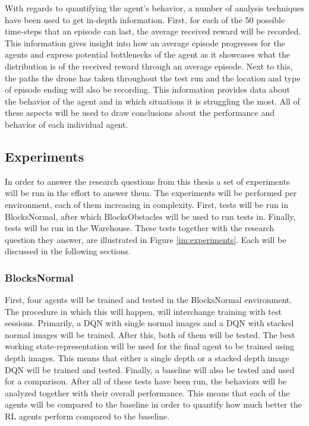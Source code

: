 With regards to quantifying the agent's behavior, a number of analysis techniques have been used 
to get in-depth information. First, for each of the 50 possible 
time-steps that an episode can last, the average received reward will be recorded. This 
information gives insight into how an average episode progresses for the agents and 
express potential bottlenecks of the agent as it showcases what the distribution is of the 
received reward through an average episode. Next to this, the paths the drone has taken 
throughout the test run and the location and type of episode ending will also be recording. 
This information provides data about the behavior of the agent and in which situations 
it is struggling the most. All of these aspects will be used to draw conclusions 
about the performance and behavior of each individual agent. 


\subsection{Experiments} \label{experiments}
In order to answer the research questions from this thesis a set of experiments will be run 
in the effort to answer them. The experiments will be performed per environment, each of them 
increasing in complexity. First, tests will be run in BlocksNormal, after which BlocksObstacles 
will be used to run tests in. Finally, tests will be run in the Warehouse. These tests together with 
the research question they answer, are illustrated 
in Figure \ref{im:experiments}. Each will be discussed in the following sections. 

\subsubsection{BlocksNormal}
First, four agents will be trained and tested in the BlocksNormal environment. The procedure 
in which this will happen, will interchange training with test sessions. Primarily, a DQN 
with single normal images and a DQN with stacked normal images will be trained. After this, 
both of them will be tested. The best working state-representation will be used for the final 
agent to be trained using depth images. This means that either a single depth or a stacked 
depth image DQN will be trained and tested. Finally, a baseline will also be tested and used 
for a comparison. After all of these tests have been run, the behaviors will be analyzed together 
with their overall performance. This means that each of the agents will be compared to the baseline 
in order to quantify how much better the RL agents perform compared to the baseline. 

